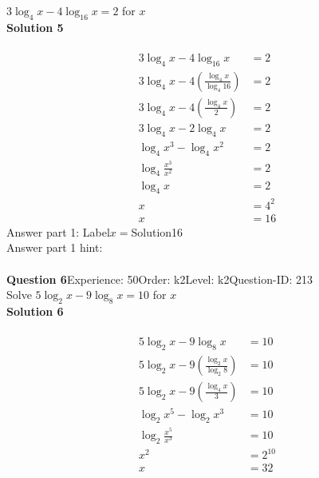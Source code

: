 \documentclass{article}
\begin{document}
$3\log_{4}x-4\log_{16}x=2$ for $x$\\[4pt]
\noindent\textbf{Solution 5}\\[2pt]
\\[-35pt]\begin{align*}
3\log_{4}x-4\log_{16}x&=2\\[2pt]
3\log_{4}x-4\left(\displaystyle\frac{\log_{4}x}{\log_{4}16}\right)&=2\\[2pt]
3\log_{4}x-4\left(\displaystyle\frac{\log_{4}x}{2}\right)&=2\\[2pt]
3\log_{4}x-2\log_{4}x&=2\\[2pt]
\log_{4}x^3-\log_{4}x^2&=2\\[2pt]
\log_{4}\displaystyle\frac{x^3}{x^2}&=2\\[2pt]
\log_{4} x&=2\\[2pt]
x&=4^2\\[2pt]
x&=16
\end{align*}
Answer part 1: \hspace{10pt}Label\hspace{10pt}$x=$\hspace{10pt}Solution\hspace{10pt}16\\
Answer part 1 hint: \hspace{15pt}\\
\\[4pt]
\noindent\textbf{Question 6}\hspace{20pt}Experience: 50\hspace{20pt}Order: k2\hspace{20pt}Level: k2\hspace{20pt}Question-ID: 213\\[2pt]
Solve $5\log_{2}x-9\log_{8}x=10$ for $x$\\[4pt]
\noindent\textbf{Solution 6}\\[2pt]
\\[-35pt]\begin{align*}
5\log_{2}x-9\log_{8}x&=10\\[2pt]
5\log_{2}x-9\left(\displaystyle\frac{\log_{2}x}{\log_{2}8}\right)&=10\\[2pt]
5\log_{2}x-9\left(\displaystyle\frac{\log_{4}x}{3}\right)&=10\\[2pt]
\log_{2}x^5-\log_{2}x^3&=10\\[2pt]
\log_{2}\displaystyle\frac{x^5}{x^3}&=10\\[2pt]
x^2&=2^{10}\\[2pt]
x&=32\\[2pt]
\end{align*}
\end{document}
